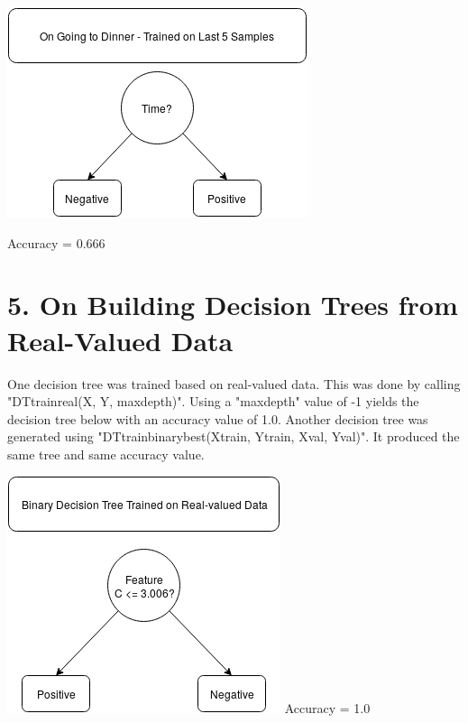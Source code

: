 \documentclass{article}
\begin{document}
\begin{center}
    \includegraphics[scale=0.75]{Last.png}
    
    \noindent Accuracy = 0.666
    
\end{center}

\section*{5. On Building Decision Trees from Real-Valued Data}

\indent One decision tree was trained based on real-valued data. This was done by calling "DT\textunderscore train\textunderscore real(X, Y, max\textunderscore depth)". Using a "max\textunderscore depth" value of -1 yields the decision tree below with an accuracy value of 1.0. Another decision tree was generated using "DT\textunderscore train\textunderscore binary\textunderscore best(X\textunderscore train, Y\textunderscore train, X\textunderscore val, Y\textunderscore val)". It produced the same tree and same accuracy value.

\begin{center}
    \includegraphics[scale=0.75]{real.png}
    \newline \newline Accuracy = 1.0
\end{center}
\end{document}
